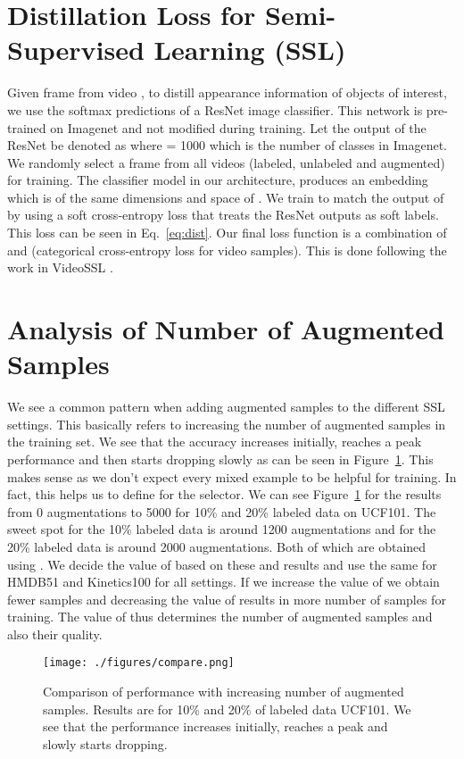 \documentclass[runningheads]{llncs}
\begin{document}
\section{Distillation Loss for Semi-Supervised Learning (SSL)}
\label{dist-loss}
Given frame  from video , to distill appearance information of objects of interest, we use the softmax predictions of a ResNet \cite{resnet} image classifier. This network is pre-trained on Imagenet and not modified during training. Let the output of the ResNet be denoted as  where  = 1000 which is the number of classes in Imagenet.  We randomly select a frame from all videos (labeled, unlabeled and augmented) for training. The classifier model in our architecture, produces an embedding  which is of the same dimensions and space of .
We train  to match the output of  by using a soft cross-entropy loss that treats the ResNet outputs as soft labels. This loss  can be seen in Eq.~\ref{eq:dist}. Our final loss function is a combination of  and  (categorical cross-entropy loss for video samples). This is done following the work in VideoSSL \cite{Jing_2021_WACV}.



\section{Analysis of Number of Augmented Samples}
\label{number_of_samples}
We see a common pattern when adding augmented samples to the different SSL settings. This basically refers to increasing the number of augmented samples in the training set.
We see that the accuracy increases initially, reaches a peak performance and then starts dropping slowly as can be seen in Figure~\ref{fig:comparison}.
This makes sense as we don't expect every mixed example to be helpful for training. In fact, this helps us to define  for the selector.
We can see Figure~\ref{fig:comparison} for the results from 0 augmentations to 5000 for 10\% and 20\% labeled data on UCF101. The sweet spot for the 10\% labeled data is around 1200 augmentations and for the 20\% labeled data is around 2000 augmentations. Both of which are obtained using . We decide the value of  based on these and results and use the same for HMDB51 and Kinetics100 for all settings. If we increase the value of  we obtain fewer samples and decreasing the value of  results in more number of samples for training. The value of  thus determines the number of augmented samples and also their quality.

\begin{figure}[]
    \centering
    \texttt{[image: ./figures/compare.png]}
\caption{Comparison of performance with increasing number of augmented samples. Results are for 10\% and 20\% of labeled data UCF101. We see that the performance increases initially, reaches a peak and slowly starts dropping.
    }
    \label{fig:comparison}
\end{figure}
\end{document}
